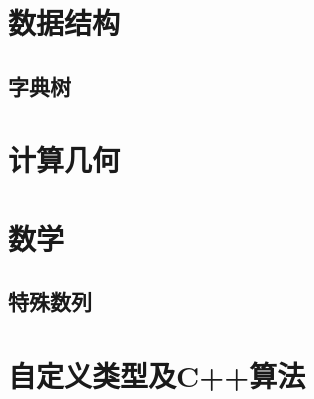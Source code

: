 \documentclass[12pt,a4paper,titlepage]{article}
\begin{document}
\section{\LARGE 数据结构}

	
	
    

	

    \subsection{字典树}
    
    

    

\section{\LARGE 计算几何}
    
    
    
	
	

\section{\LARGE 数学}
    
    
    
	
    
	
    
	

    \subsection{特殊数列}
    
    
    
	

\section{\LARGE 自定义类型及C++算法}
    
    

\end{document}
